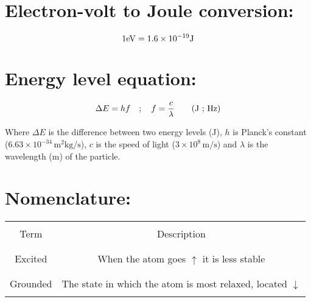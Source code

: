\documentclass[11pt]{article}
\begin{document}
	\section{Electron-volt to Joule conversion: }
	\begin{equation}
		1\si{\electronvolt} = 1.6\times10^{-19}\si{\joule}\notag
	\end{equation}
\section{Energy level equation: }
\begin{equation}
	\Delta E = hf\quad;\quad f=\frac{c}{\lambda}\tag{\si{\joule} ; \si{\hertz}}
\end{equation}
\begin{center}
	Where $\Delta E$ is the difference between two energy levels (\si{\joule}), $h$ is Planck's constant ($6.63\times10^{-34}\,\si{\meter\squared\kilogram\per\second}$), $c$ is the speed of light ($3\times10^8\,\si{\meter\per\second}$) and $\lambda$ is the wavelength (\si{\meter}) of the particle.
\end{center}

\section{Nomenclature: }
\begin{center}
		\begin{tabular}{|c|c|}
			\hline
			&	\\Term       & Description                                                       \\&\\ \hline
			&	\\Excited  & When the atom goes $\uparrow$ it is less stable\\&\\ \hline
			&	\\Grounded   & The state in which the atom is most relaxed, located $\downarrow$\\&\\ \hline
		\end{tabular}
\end{center}
\end{document}
